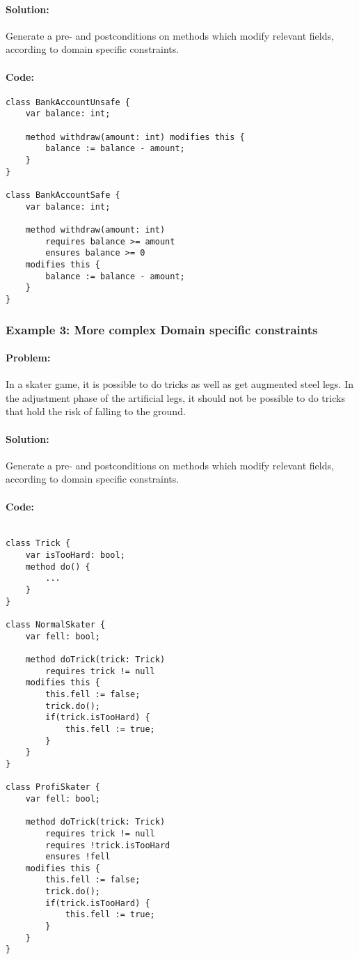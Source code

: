 \paragraph{Solution:}
Generate a pre- and postconditions on methods which modify relevant fields, according to domain specific constraints.

\paragraph{Code:}
\lstset{style=dafny}
\begin{lstlisting}
class BankAccountUnsafe {
	var balance: int;
	
	method withdraw(amount: int) modifies this {
		balance := balance - amount;
	}
}

class BankAccountSafe {
	var balance: int;
	
	method withdraw(amount: int) 
		requires balance >= amount  
		ensures balance >= 0  
	modifies this {
		balance := balance - amount;
	}
}
\end{lstlisting}


\subsubsection{Example 3: More complex Domain specific constraints} \label{Example 3}
\paragraph{Problem:}
In a skater game, it is possible to do tricks as well as get augmented steel legs. In the adjustment phase of the artificial legs, it should not be possible to do tricks that hold the risk of falling to the ground.
\paragraph{Solution:}
Generate a pre- and postconditions on methods which modify relevant fields, according to domain specific constraints.

\paragraph{Code:}
\lstset{style=dafny}
\begin{lstlisting}

class Trick {
	var isTooHard: bool;
	method do() {
		...
	}
}

class NormalSkater {
	var fell: bool;
	
	method doTrick(trick: Trick) 
		requires trick != null
	modifies this {
		this.fell := false;
		trick.do();
		if(trick.isTooHard) {
			this.fell := true;
		}
	}
}

class ProfiSkater {
	var fell: bool;
	
	method doTrick(trick: Trick) 
		requires trick != null
		requires !trick.isTooHard
		ensures !fell
	modifies this {
		this.fell := false;
		trick.do();
		if(trick.isTooHard) {
			this.fell := true;
		}
	}
}

\end{lstlisting}

